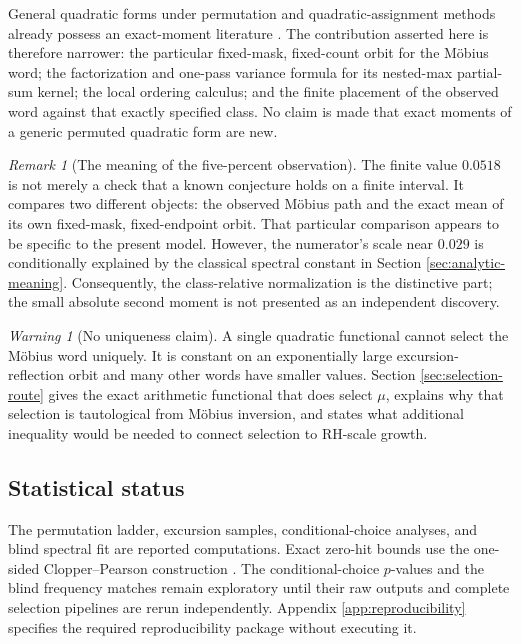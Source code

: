 \documentclass[11pt,reqno]{amsart}
\numberwithin{equation}{section}
\theoremstyle{plain}
\theoremstyle{definition}
\theoremstyle{remark}
\newtheorem{remark}[theorem]{Remark}
\newtheorem{warning}[theorem]{Warning}
\begin{document}
General quadratic forms under permutation and quadratic-assignment methods
already possess an exact-moment literature
\cite{Hoeffding1951,HubertSchultz1976,ZhouEtAl2013}.  The contribution
asserted here is therefore narrower: the particular fixed-mask, fixed-count
orbit for the M\"obius word; the factorization and one-pass variance formula
for its nested-max partial-sum kernel; the local ordering calculus; and the
finite placement of the observed word against that exactly specified class.
No claim is made that exact moments of a generic permuted quadratic form are
new.

\begin{remark}[The meaning of the five-percent observation]
\label{rem:five-percent-status}
The finite value \(0.0518\) is not merely a check that a known conjecture
holds on a finite interval.  It compares two different objects: the observed
M\"obius path and the exact mean of its own fixed-mask, fixed-endpoint orbit.
That particular comparison appears to be specific to the present model.
However, the numerator's scale near \(0.029\) is conditionally explained by
the classical spectral constant in Section \ref{sec:analytic-meaning}.
Consequently, the class-relative normalization is the distinctive part; the
small absolute second moment is not presented as an independent discovery.
\end{remark}

\begin{warning}[No uniqueness claim]
\label{warn:no-uniqueness-from-quadratic-mass}
A single quadratic functional cannot select the M\"obius word uniquely.  It
is constant on an exponentially large excursion-reflection orbit and many
other words have smaller values.  Section \ref{sec:selection-route} gives the
exact arithmetic functional that does select \(\mu\), explains why that
selection is tautological from M\"obius inversion, and states what additional
inequality would be needed to connect selection to RH-scale growth.
\end{warning}

\subsection{Statistical status}
\label{subsec:statistical-status}

The permutation ladder, excursion samples, conditional-choice analyses, and
blind spectral fit are reported computations.  Exact zero-hit bounds use the
one-sided Clopper--Pearson construction \cite{ClopperPearson1934}.  The
conditional-choice \(p\)-values and the blind frequency matches remain
exploratory until their raw outputs and complete selection pipelines are
rerun independently.  Appendix \ref{app:reproducibility} specifies the
required reproducibility package without executing it.
\end{document}
